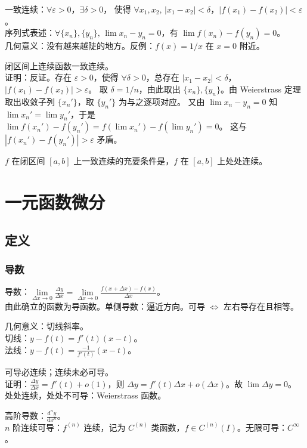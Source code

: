 \documentclass[12pt, a4paper, UTF8, openany]{ctexbook}
\newcommand{\dif}{\mathrm{d}}
\newcommand{\eps}{\varepsilon}
\begin{document}
        一致连续：$\forall \eps > 0$，$\exists \delta > 0$，
        使得 $\forall x_1, x_2, \, |x_1 - x_2| < \delta$，$|f(x_1) - f(x_2)| < \eps$。\\
        序列式表述：$\forall \{x_n\},\{y_n\}, \, \lim x_n - y_n = 0$，有 $\lim f(x_n) - f(y_n) = 0$。\\
        几何意义：没有越来越陡的地方。反例：$f(x) = 1 / x$ 在 $x = 0$ 附近。

        闭区间上连续函数一致连续。\\
        证明：反证。存在 $\eps > 0$，使得 $\forall \delta > 0$，总存在 $|x_1 - x_2| < \delta$，$|f(x_1) - f(x_2)| > \eps$。
        取 $\delta = 1 / n$，由此取出 $\{x_n\}, \{y_n\}$。由 Weierstrass 定理取出收敛子列 $\{x_n'\}$，取 $\{y_n'\}$ 为与之逐项对应。
        又由 $\lim x_n - y_n = 0$ 知 $\lim x_n' = \lim y_n'$，于是 $\lim f(x_n') - f(y_n') = f(\lim x_n') - f(\lim y_n') = 0$。
        这与 $|f(x_n') - f(y_n')| > \eps$ 矛盾。

        $f$ 在闭区间 $[a, b]$ 上一致连续的充要条件是，$f$ 在 $[a, b]$ 上处处连续。

    \chapter{一元函数微分}
    \section{定义}
        \subsection{导数}
        导数：$\lim\limits_{\Delta x \to 0} \frac{\Delta y}{\Delta x} 
        = \lim\limits_{\Delta x \to 0} \frac{f(x + \Delta x) - f(x)}{\Delta x}$。\\
        由此确立的函数为导函数。单侧导数：逼近方向。可导 $\iff$ 左右导存在且相等。

        几何意义：切线斜率。\\
        切线：$y - f(t) = f'(t)(x - t)$。\\
        法线：$y - f(t) = \frac{-1}{f'(t)}(x - t)$。

        可导必连续；连续未必可导。\\
        证明：$\frac{\Delta y}{\Delta x} = f'(t) + o(1)$，则 $\Delta y = f'(t)\Delta x + o(\Delta x)$。故 $\lim \Delta y = 0$。\\
        处处连续，处处不可导：Weierstrass 函数。

        高阶导数：$\frac{\dif^n y}{\dif x^n}$。\\
        $n$ 阶连续可导：$f^{(n)}$ 连续，记为 $C^{(n)}$ 类函数，$f \in C^{(n)}(I)$。无限可导：$C^{\infty}$。
\end{document}
